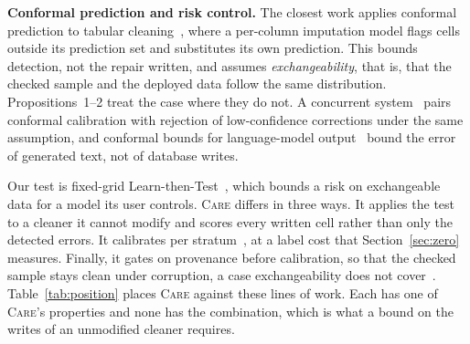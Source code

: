 \documentclass[sigconf, nonacm, balance=false]{acmart}
\theoremstyle{remark}
\begin{document}
\textbf{Conformal prediction and risk control.} The closest work applies conformal prediction to tabular cleaning~\cite{pmlr-v238-jager24a}, where a per-column imputation model flags cells outside its prediction set and substitutes its own prediction. This
bounds detection, not the repair written, and assumes \emph{exchangeability}, that is,
that the checked sample and the deployed data follow the same distribution.
Propositions~1--2 treat the case where they do not. A concurrent system~\cite{math14101599}
pairs conformal calibration with rejection of low-confidence corrections under the same
assumption, and conformal bounds for language-model output~\cite{quach2024conformal,
mohri2024conformal} bound the error of generated text, not of database writes.

Our test is fixed-grid Learn-then-Test~\cite{10.1214/24-AOAS1998}, which bounds a
risk on exchangeable data for a model its user controls. \textsc{Care} differs in three
ways. It applies the test to a cleaner it cannot modify and scores every written cell
rather than only the detected errors. It calibrates per
stratum~\cite{vovk2003mondrian, romano2020equalized}, at a label cost that
Section~\ref{sec:zero} measures. Finally, it gates on provenance before calibration, so that
the checked sample stays clean under corruption, a case exchangeability does not
cover~\cite{10.1214/23-AOS2276}. Table~\ref{tab:position} places \textsc{Care} against
these lines of work. Each has one of \textsc{Care}'s properties and none has the
combination, which is what a bound on the writes of an unmodified cleaner requires.
\end{document}
